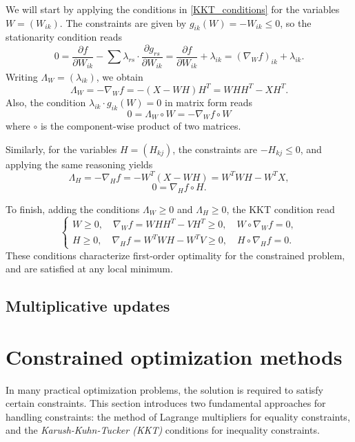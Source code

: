 \documentclass{amsart}
\begin{document}
We will start by applying the conditions in \eqref{KKT_conditions} for the variables $W=(W_{ik})$. The constraints are given by $g_{ik}(W)= -W_{ik}\leq 0$, so the stationarity condition reads
\[
    0= \frac{\partial f}{\partial W_{ik}} -\sum_{} \lambda_{rs}\cdot \frac{\partial g_{rs}}{\partial W_{ik}} = \frac{\partial f}{\partial W_{ik}} +\lambda_{ik}= \left(\nabla_W f\right)_{ik} +\lambda_{ik}.
\]
Writing $\Lambda_W=(\lambda_{ik})$, we obtain
\[
    \Lambda_W= -\nabla_W f= -(X-WH)H^T= WHH^T -XH^T.
\]
Also, the condition $\lambda_{ik}\cdot g_{ik}(W)=0$ in matrix form reads
\[
    0= \Lambda_W\circ W= -\nabla_W f\circ W
\]
where $\circ$ is the component-wise product of two matrices.

Similarly, for the variables $H=(H_{kj})$, the constraints are $-H_{kj}\leq 0$, and applying the same reasoning yields
\[
    \Lambda_H= -\nabla_H f= -W^T(X-WH)= W^TWH -W^TX,
\]
\[
    0= \nabla_H f\circ H.
\]

To finish, adding the conditions $\Lambda_W\geq 0$ and $\Lambda_H\geq 0$, the KKT condition read
\begin{equation}
    \begin{cases}
        W \geq 0,\quad \nabla_W f = WHH^T - VH^T \geq 0,\quad W \circ \nabla_W f = 0, \\
        H \geq 0,\quad \nabla_H f = W^TWH - W^TV \geq 0,\quad H \circ \nabla_H f = 0.
    \end{cases}
\end{equation}
These conditions characterize first-order optimality for the constrained problem, and are satisfied at any local minimum.

\subsection{Multiplicative updates}




\appendix

\section{Constrained optimization methods}\label{constrained_optimization_methods}

In many practical optimization problems, the solution is required to satisfy certain constraints. This section introduces two fundamental approaches for handling constraints: the method of Lagrange multipliers for equality constraints, and the {\it Karush-Kuhn-Tucker (KKT)} conditions for inequality constraints.
\end{document}
